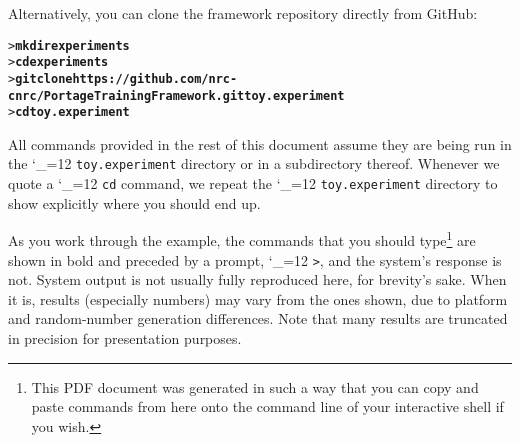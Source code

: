 \documentclass[11pt,letterpaper]{article}
\def\code{\begingroup\catcode`\_=12 \codex}
\newcommand{\codex}[1]{\texttt{#1}\endgroup}
\begin{document}
Alternatively, you can clone the framework repository directly from GitHub:
\begin{small}
\begin{alltt}
   > \textbf{mkdir experiments}
   > \textbf{cd experiments}
   > \textbf{git clone https://github.com/nrc-cnrc/PortageTrainingFramework.git toy.experiment}
   > \textbf{cd toy.experiment}
\end{alltt}
\end{small}

All commands provided in the rest of this document assume they are being run in
the \code{toy.experiment} directory or in a subdirectory thereof.  Whenever we
quote a \code{cd} command, we repeat the \code{toy.experiment} directory to
show explicitly where you should end up.

As you work through the example, the commands that you should type\footnote{This
   PDF document was generated in such a way that you can copy and paste commands
   from here onto the command line of your interactive shell if you wish.}
are shown in bold and preceded by a prompt, \code{>}, and the system's response
is not.  System output is not usually fully reproduced here, for brevity's
sake. When it is, results (especially numbers) may vary from the ones
shown, due to platform and random-number generation differences. Note that many results are
truncated in precision for presentation purposes.
\end{document}
